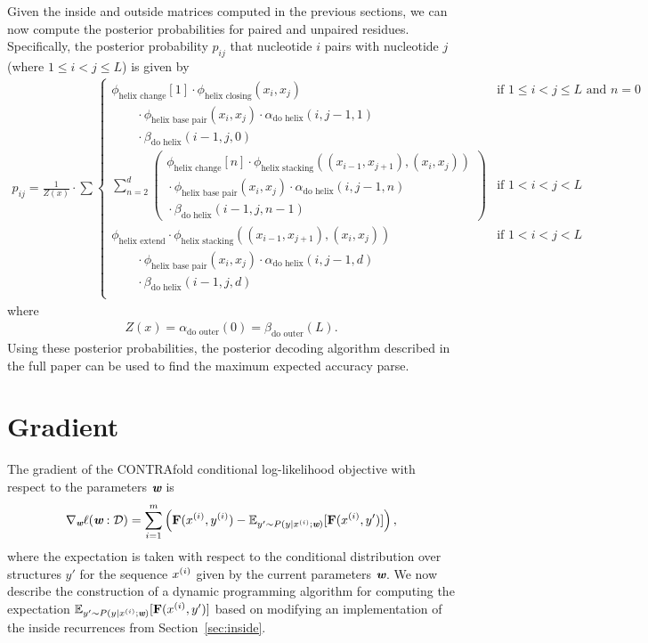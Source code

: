 \documentclass{article}
\newcommand{\Adoouter}{\alpha_\text{do outer}}
\newcommand{\Bdoouter}{\beta_\text{do outer}}
\newcommand{\helixstacking}{\phi_\text{helix stacking}}
\newcommand{\helixbasepair}{\phi_\text{helix base pair}}
\newcommand{\helixextend}{\phi_\text{helix extend}}
\newcommand{\helixclosing}{\phi_\text{helix closing}}
\newcommand{\helixchange}{\phi_\text{helix change}}
\newcommand{\Adohelix}{\alpha_\text{do helix}}
\newcommand{\Bdohelix}{\beta_\text{do helix}}
\begin{document}
  Given the inside and outside matrices computed in the previous sections, we can now compute the
  posterior probabilities for paired and unpaired residues.  Specifically, the posterior probability
  $p_{ij}$ that nucleotide $i$ pairs with nucleotide $j$ (where $1 \le i < j \le L$) is given by
  \begin{align}
    p_{ij} = \frac{1}{Z(x)} \cdot \sum \begin{cases}
      \helixchange[1] \cdot \helixclosing(x_i,x_j) & \text{if $1 \le i < j \le L$ and $n=0$}\\
      \qquad{} \cdot \helixbasepair(x_i,x_j) \cdot \Adohelix(i,j-1,1) \\
      \qquad{} \cdot \Bdohelix(i-1,j,0) \\
      \displaystyle\sum_{n=2}^{d} \left(
      \begin{matrix}
	\helixchange[n] \cdot \helixstacking((x_{i-1},x_{j+1}),(x_{i},x_j)) \\
		    {} \cdot \helixbasepair (x_{i}, x_j) \cdot \Adohelix(i,j-1,n) \\
		    {} \cdot \Bdohelix(i-1,j,n-1)
      \end{matrix}
      \right) & \text{if $1 < i < j < L$} \\
      \helixextend \cdot \helixstacking((x_{i-1},x_{j+1}),(x_{i},x_{j})) & \text{if $1<i<j<L$} \\
      \qquad{} \cdot \helixbasepair (x_{i}, x_j) \cdot \Adohelix(i,j-1,d) \\
      \qquad{} \cdot \Bdohelix(i-1,j,d) \\
    \end{cases}
  \end{align}
  where
  \begin{align}
    Z(x) = \Adoouter(0) = \Bdoouter(L).
  \end{align}
  Using these posterior probabilities, the posterior decoding algorithm described in the
  full paper can be used to find the maximum expected accuracy parse.

  \newpage
  \section{Gradient}
  
  The gradient of the CONTRAfold conditional log-likelihood objective with respect to the
  parameters ${\textbf{\em w}}$ is
  \begin{align*}
    \nabla_{\textbf{\em w}} \ell({\textbf{\em w}} : {\mathcal{D}}) = \sum_{i=1}^m \left({\mathbf{F}}(x^{({i})},y^{({i})}) - {\mathbb{E}}_{y' \sim P(y \mid x^{({i})}; {\textbf{\em w}})} [{\mathbf{F}}(x^{({i})}, y')]\right),
  \end{align*}
  where the expectation is taken with respect to the conditional distribution over structures $y'$ for the sequence $x^{({i})}$ given by the
  current parameters ${\textbf{\em w}}$.  We now describe the construction of a dynamic programming algorithm for computing the expectation 
  ${\mathbb{E}}_{y' \sim P(y \mid x^{({i})}; {\textbf{\em w}})} [{\mathbf{F}}(x^{({i})}, y')]$ based on modifying an implementation of the inside 
  recurrences from Section~\ref{sec:inside}.
  
\end{document}
